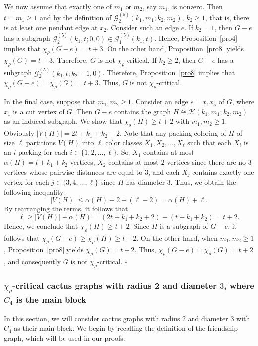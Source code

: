 \documentclass[12pt]{article}
\newcommand{\qed}{\hfill $\square$ \bigskip}
\newcommand{\ie}{that is}
\begin{document}
We now assume that exactly one of $m_1$ or $m_2$, say $m_1$, is nonzero. Then $t=m_1 \geq 1$ and by the definition of $\mathcal{G}_{2}^{(5)}(k_{1},m_{1};k_{2},m_{2})$, $k_2 \geq 1$, \ie, there is at least one pendant edge at $x_2$. Consider such an edge $e$. If $k_2=1$,
then $G-e$ has a subgraph $\mathcal{G}_{2}^{(5)}(k_{1},t;0,0) \in \mathcal{G}_{1}^{(5)}(k_1, t)$. Hence, Proposition~\ref{pro4} implies that \( \chi_\rho(G-e) = t + 3 \). 
On the other hand, Proposition~\ref{pro8} yields $\chi_\rho(G)=t+3$.
Therefore, $G$ is not $\chi_\rho$-critical.
If $k_2\ge 2$, then $G-e$ has a subgraph $\mathcal{G}_{2}^{(5)}(k_{1},t;k_2-1,0)$. Therefore, Proposition~\ref{pro8} implies that \( \chi_\rho(G-e)=\chi_\rho(G) = t + 3 \).
Thus, $G$ is not $\chi_\rho$-critical.
	
In the final case, suppose that $m_1, m_2 \geq 1$. Consider an edge $e=x_1x_5$ of \(G\), where $x_1$ is a cut vertex of $G$. 
Then $G-e$ contains the graph $H \cong \mathcal{H}(k_1, m_1; k_2, m_2)$ as an induced subgraph. 
We show that \( \chi_\rho(H) \ge t + 2 \) with $m_1, m_2 \geq 1$. Obviously $|V(H)|=2t + k_1 + k_2 + 2$. Note that any packing coloring of $H$ of size $\ell$ partitions $V(H)$ into $\ell$ color classes $X_1, X_2, \dots, X_{\ell}$ such that each $X_i$ is an $i$-packing for each $i \in \{1, 2, \dots, \ell\}$. So, $X_1$ contains at most $\alpha(H)=t+k_1+k_2$ vertices, $X_2$ contains at most $2$ vertices since there are no $3$ vertices whose pairwise distances are equal to $3$, and each $X_j$ contains exactly one vertex for each $j \in \{3, 4, \dots, \ell\}$ since $H$ has diameter $3$. Thus, we obtain the following inequality:
$$|V(H)| \leq \alpha(H) + 2 + (\ell - 2) = \alpha(H) + \ell.$$
By rearranging the terms, it follows that
\[
\ell \geq |V(H)| - \alpha(H) 
= (2t + k_1 + k_2 + 2) - (t+k_1+k_2) 
= t+2.
\]
Hence, we conclude that $\chi_{\rho}(H) \geq t+2.$
Since $H$ is a subgraph of $G-e$, it follows that \( \chi_\rho(G - e) \ge \chi_\rho(H) \ge t + 2 \). On the other hand, when \( m_1, m_2 \ge 1 \), Proposition~\ref{pro8} yields \( \chi_\rho(G) = t + 2 \). 
Thus, \( \chi_\rho(G - e) = \chi_\rho(G)=t+2 \), and consequently \( G \) is not \( \chi_\rho \)-critical. 
\qed

\subsubsection{$\chi_{\rho}$-critical cactus graphs with radius 2 and diameter $3$, where $C_4$ is the main block}
In this section, we will consider cactus graphs with radius 2 and diameter $3$ with $C_4$ as their main block. We begin by recalling the definition of the friendship graph, which will be used in our proofs.
\end{document}
